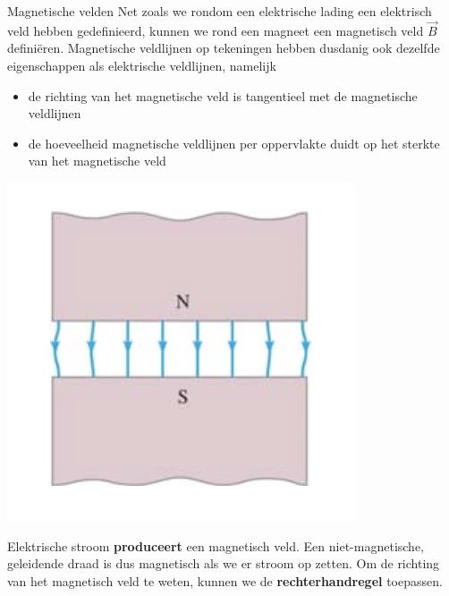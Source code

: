 \begin{theo}{Magnetische velden}
    Net zoals we rondom een elektrische lading een elektrisch veld hebben gedefinieerd, kunnen we rond een magneet een magnetisch veld
    $\Vec{B}$ definiëren. Magnetische veldlijnen op tekeningen hebben dusdanig ook dezelfde eigenschappen als elektrische veldlijnen, namelijk

    \begin{minipage}{.7\textwidth}
        \begin{itemize}
            \item de richting van het magnetische veld is tangentieel met de magnetische veldlijnen
            \item de hoeveelheid magnetische veldlijnen per oppervlakte duidt op het sterkte van het magnetische veld
        \end{itemize}

    \end{minipage}
    \hspace{0.5cm}\begin{minipage}{.26\textwidth}
        \includegraphics[scale = 0.45]{Images/Magnetisme/HomogeenMagnetischVeld}
    \end{minipage}

    \noindent Elektrische stroom \textbf{produceert} een magnetisch veld. Een niet-magnetische, geleidende draad is dus magnetisch als we er stroom op zetten.
    Om de richting van het magnetisch veld te weten, kunnen we de \textbf{rechterhandregel} toepassen.


\end{theo}

